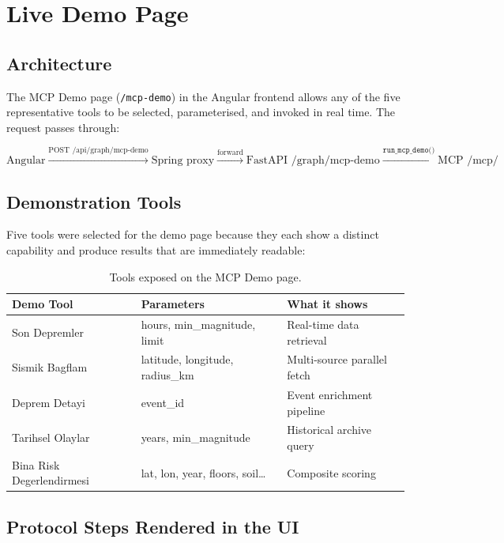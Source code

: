 \documentclass[11pt,a4paper]{article}
\begin{document}
\section{Live Demo Page}

\subsection{Architecture}

The MCP Demo page (\texttt{/mcp-demo}) in the Angular frontend allows any of the
five representative tools to be selected, parameterised, and invoked in real time.
The request passes through:

\[
\text{Angular} \xrightarrow{\text{POST /api/graph/mcp-demo}} \text{Spring proxy}
\xrightarrow{\text{forward}} \text{FastAPI /graph/mcp-demo}
\xrightarrow{\texttt{run\_mcp\_demo()}} \text{MCP /mcp/}
\]

\subsection{Demonstration Tools}

Five tools were selected for the demo page because they each show a distinct
capability and produce results that are immediately readable:

\begin{table}[H]
\centering
\begin{tabular}{@{}lll@{}}
\toprule
\textbf{Demo Tool} & \textbf{Parameters} & \textbf{What it shows} \\
\midrule
Son Depremler          & hours, min\_magnitude, limit        & Real-time data retrieval \\
Sismik Bagflam         & latitude, longitude, radius\_km     & Multi-source parallel fetch \\
Deprem Detayi          & event\_id                           & Event enrichment pipeline \\
Tarihsel Olaylar       & years, min\_magnitude               & Historical archive query \\
Bina Risk Degerlendirmesi & lat, lon, year, floors, soil\ldots & Composite scoring \\
\bottomrule
\end{tabular}
\caption{Tools exposed on the MCP Demo page.}
\end{table}

\subsection{Protocol Steps Rendered in the UI}
\end{document}
